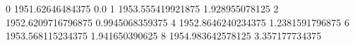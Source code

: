 0 1951.62646484375 0.0
1 1953.555419921875 1.928955078125
2 1952.6209716796875 0.9945068359375
4 1952.8646240234375 1.2381591796875
6 1953.568115234375 1.941650390625
8 1954.983642578125 3.357177734375

